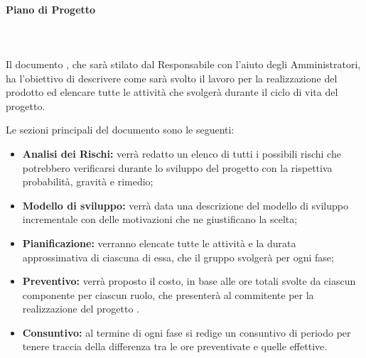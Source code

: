 \paragraph{Piano di Progetto}\mbox{}
\\\\Il documento \PdP, che sarà stilato dal Responsabile con l'aiuto degli Amministratori, ha l'obiettivo di descrivere come sarà svolto il lavoro per la realizzazione del prodotto ed elencare tutte le attività che \Gruppo{} svolgerà durante il ciclo di vita del progetto.


Le sezioni principali del documento sono le seguenti:
\begin{itemize}
	\item \textbf{Analisi dei Rischi:} verrà redatto un elenco di tutti i possibili rischi che potrebbero verificarsi durante lo sviluppo del progetto con la rispettiva probabilità, gravità e rimedio;
	\item \textbf{Modello di sviluppo:} verrà data una descrizione del modello di sviluppo incrementale con delle motivazioni che ne giustificano la scelta;
	\item \textbf{Pianificazione:} verranno elencate tutte le attività e la durata approssimativa di ciascuna di essa, che il gruppo svolgerà per ogni fase;
	\item \textbf{Preventivo:} verrà proposto il costo, in base alle ore totali svolte da ciascun componente per ciascun ruolo, che \Gruppo{} presenterà al commitente per la realizzazione del progetto \NomeProgetto{}.
	\item \textbf{Consuntivo:} al termine di ogni fase si redige un consuntivo di periodo per tenere traccia della differenza tra le ore preventivate e quelle effettive.
\end{itemize}